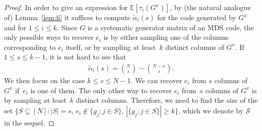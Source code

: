 \documentclass[10pt,a4paper]{amsart}
\newcommand{\E}{\mathbb{E}}
\newcommand{\mS}{\mathcal{S}}
\begin{document}
\begin{proof}
In order to give an expression for $\E[\tau_i(G^x)]$, by (the natural analogue of) Lemma~\ref{lem:fi} it suffices to compute $\widetilde{\alpha}_i(s)$
for the code generated by $G^x$ and for $1\leq i\leq k$. Since $G$ is a systematic generator matrix of an MDS code, the only possible ways to recover $e_i$ is by either sampling one of the columns corresponding to $e_i$ itself, or by sampling at least~$k$ distinct columns of $G^x$. If $1\le s \le k-1$, it is not hard to see that 
\begin{align*}
        \widetilde{\alpha}_i(s) = \binom{N}{s}-\binom{N-x}{s}.
\end{align*}
We then focus on the case
$k\le s \le N-1$.
We can recover $e_i$ from $s$ columns of $G^x$ if~$e_i$ is one of them. The only other way to recover $e_i$ from~$s$ columns of $G^x$ is by sampling at least~$k$ distinct columns. Therefore, we need to find the size of the set
    $\{S \subseteq [N] : |S|=s, \, e_i \notin \{g_j : j \in S\}, \, |\{ g_j : j \in S\}| \ge k\}$,
    which we denote by $\mS$ in the sequel.
    

\end{proof}
\end{document}
